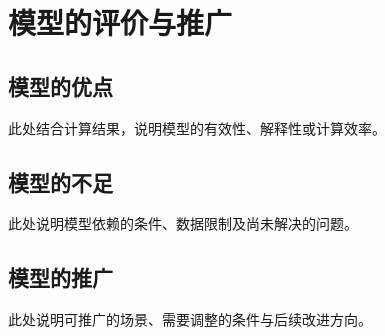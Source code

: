 \section{模型的评价与推广}
\subsection{模型的优点}
此处结合计算结果，说明模型的有效性、解释性或计算效率。

\subsection{模型的不足}
此处说明模型依赖的条件、数据限制及尚未解决的问题。

\subsection{模型的推广}
此处说明可推广的场景、需要调整的条件与后续改进方向。
